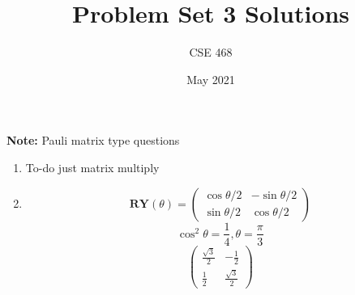 \documentclass[12pt]{article}
\title{Problem Set 3 Solutions}
\author{CSE 468}
\date{May 2021}
\begin{document}
\maketitle

\noindent \textbf{Note:} Pauli matrix type questions

\begin{enumerate}[font=\bfseries]
    \item To-do just matrix multiply
    \item \[\mathbf{RY}(\theta) = \begin{pmatrix} \cos{\theta/2} & -\sin{\theta/2} \\
    \sin{\theta/2} & \cos{\theta/2}
    \end{pmatrix}\]
    \[\cos^2{\theta} = \frac{1}{4}, \theta = \frac{\pi}{3}\]
    \[\begin{pmatrix} 
    \frac{\sqrt{3}}{2} & -\frac{1}{2} \\
    \frac{1}{2} & \frac{\sqrt{3}}{2}
        \end{pmatrix}
    \]
\end{enumerate}
\end{document}
